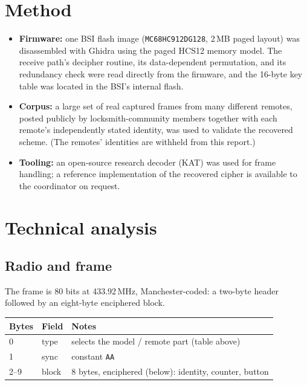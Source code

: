 \documentclass[11pt,a4paper]{article}
\newcommand{\hex}[1]{\texttt{#1}}
\begin{document}
\section{Method}
\begin{itemize}
\item \textbf{Firmware:} one BSI flash image (\hex{MC68HC912DG128}, 2\,MB paged layout) was disassembled with Ghidra using the paged HCS12 memory model. The receive path's decipher routine, its data-dependent permutation, and its redundancy check were read directly from the firmware, and the 16-byte key table was located in the BSI's internal flash.
\item \textbf{Corpus:} a large set of real captured frames from many different remotes, posted publicly by locksmith-community members together with each remote's independently stated identity, was used to validate the recovered scheme. (The remotes' identities are withheld from this report.)
\item \textbf{Tooling:} an open-source research decoder (KAT) was used for frame handling; a reference implementation of the recovered cipher is available to the coordinator on request.
\end{itemize}

\section{Technical analysis}
\subsection{Radio and frame}
The frame is 80 bits at 433.92\,MHz, Manchester-coded: a two-byte header followed by an eight-byte enciphered block.
\begin{table}[h]
\centering\small
\begin{tabular}{lll}
\toprule
Bytes & Field & Notes \\
\midrule
0 & type & selects the model / remote part (table above) \\
1 & sync & constant \hex{AA} \\
2--9 & block & 8 bytes, enciphered (below): identity, counter, button \\
\bottomrule
\end{tabular}
\end{table}
\end{document}
